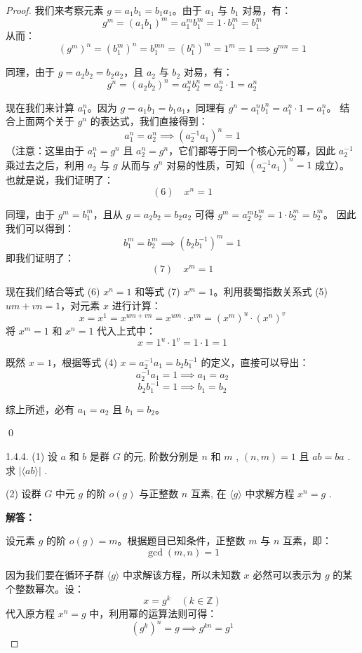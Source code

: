 \documentclass[]{article}
\begin{document}
\begin{proof}
我们来考察元素 $g = a_1 b_1 = b_1 a_1$。由于 $a_1$ 与 $b_1$ 对易，有：
\[ g^m = (a_1 b_1)^m = a_1^m b_1^m = 1 \cdot b_1^m = b_1^m \]
从而：
\[ (g^m)^n = (b_1^m)^n = b_1^{mn} = (b_1^n)^m = 1^m = 1 \implies g^{mn} = 1 \]

同理，由于 $g = a_2 b_2 = b_2 a_2$，且 $a_2$ 与 $b_2$ 对易，有：
\[ g^n = (a_2 b_2)^n = a_2^n b_2^n = a_2^n \cdot 1 = a_2^n \]

现在我们来计算 $a_1^n$。因为 $g = a_1 b_1 = b_1 a_1$，同理有 $g^n = a_1^n b_1^n = a_1^n \cdot 1 = a_1^n$。
结合上面两个关于 $g^n$ 的表达式，我们直接得到：
\[ a_1^n = a_2^n \implies (a_2^{-1} a_1)^n = 1 \]
（注意：这里由于 $a_1^n = g^n$ 且 $a_2^n = g^n$，它们都等于同一个核心元的幂，因此 $a_2^{-1}$ 乘过去之后，利用 $a_2$ 与 $g$ 从而与 $g^n$ 对易的性质，可知 $(a_2^{-1} a_1)^n = 1$ 成立）。
也就是说，我们证明了：
\[ (6) \quad x^n = 1 \]

同理，由于 $g^m = b_1^m$，且从 $g = a_2 b_2 = b_2 a_2$ 可得 $g^m = a_2^m b_2^m = 1 \cdot b_2^m = b_2^m$。
因此我们可以得到：
\[ b_1^m = b_2^m \implies (b_2 b_1^{-1})^m = 1 \]
即我们证明了：
\[ (7) \quad x^m = 1 \]

现在我们结合等式 (6) $x^n = 1$ 和等式 (7) $x^m = 1$。利用裴蜀指数关系式 (5) $um + vn = 1$，对元素 $x$ 进行计算：
\[ x = x^1 = x^{um + vn} = x^{um} \cdot x^{vn} = (x^m)^u \cdot (x^n)^v \]
将 $x^m = 1$ 和 $x^n = 1$ 代入上式中：
\[ x = 1^u \cdot 1^v = 1 \cdot 1 = 1 \]

既然 $x = 1$，根据等式 (4) $x = a_2^{-1} a_1 = b_2 b_1^{-1}$ 的定义，直接可以导出：
\[ a_2^{-1} a_1 = 1 \implies a_1 = a_2 \]
\[ b_2 b_1^{-1} = 1 \implies b_1 = b_2 \]

综上所述，必有 $a_1 = a_2$ 且 $b_1 = b_2$。

\qed

1.4.4. (1) 设 $a$ 和 $b$ 是群 $G$ 的元, 阶数分别是 $n$ 和 $m$ , $(n, m) = 1$ 且 $ab = ba$ . 求 $|\langle ab\rangle|$ . 

(2) 设群 $G$ 中元 $g$ 的阶 $o(g)$ 与正整数 $n$ 互素, 在 $\langle g\rangle$ 中求解方程 $x^n = g$ . 

\bigskip
\noindent \textbf{解答：} 

设元素 $g$ 的阶 $o(g) = m$。根据题目已知条件，正整数 $m$ 与 $n$ 互素，即：
\[ \gcd(m, n) = 1 \]

因为我们要在循环子群 $\langle g\rangle$ 中求解该方程，所以未知数 $x$ 必然可以表示为 $g$ 的某个整数幂次。设：
\[ x = g^k \quad (k \in \mathbb{Z}) \]
代入原方程 $x^n = g$ 中，利用幂的运算法则可得：
\[ (g^k)^n = g \implies g^{kn} = g^1 \]


\end{proof}
\end{document}
